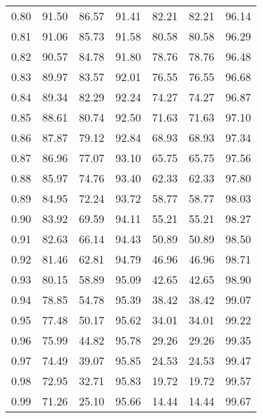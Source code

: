 \begin{tabular}{|c|c|c|c|c|c|c|}
      0.80 &     91.50 &     86.57 &      91.41 &   82.21 &      82.21 &         96.14 \\
      0.81 &     91.06 &     85.73 &      91.58 &   80.58 &      80.58 &         96.29 \\
      0.82 &     90.57 &     84.78 &      91.80 &   78.76 &      78.76 &         96.48 \\
      0.83 &     89.97 &     83.57 &      92.01 &   76.55 &      76.55 &         96.68 \\
      0.84 &     89.34 &     82.29 &      92.24 &   74.27 &      74.27 &         96.87 \\
      0.85 &     88.61 &     80.74 &      92.50 &   71.63 &      71.63 &         97.10 \\
      0.86 &     87.87 &     79.12 &      92.84 &   68.93 &      68.93 &         97.34 \\
      0.87 &     86.96 &     77.07 &      93.10 &   65.75 &      65.75 &         97.56 \\
      0.88 &     85.97 &     74.76 &      93.40 &   62.33 &      62.33 &         97.80 \\
      0.89 &     84.95 &     72.24 &      93.72 &   58.77 &      58.77 &         98.03 \\
      0.90 &     83.92 &     69.59 &      94.11 &   55.21 &      55.21 &         98.27 \\
      0.91 &     82.63 &     66.14 &      94.43 &   50.89 &      50.89 &         98.50 \\
      0.92 &     81.46 &     62.81 &      94.79 &   46.96 &      46.96 &         98.71 \\
      0.93 &     80.15 &     58.89 &      95.09 &   42.65 &      42.65 &         98.90 \\
      0.94 &     78.85 &     54.78 &      95.39 &   38.42 &      38.42 &         99.07 \\
      0.95 &     77.48 &     50.17 &      95.62 &   34.01 &      34.01 &         99.22 \\
      0.96 &     75.99 &     44.82 &      95.78 &   29.26 &      29.26 &         99.35 \\
      0.97 &     74.49 &     39.07 &      95.85 &   24.53 &      24.53 &         99.47 \\
      0.98 &     72.95 &     32.71 &      95.83 &   19.72 &      19.72 &         99.57 \\
      0.99 &     71.26 &     25.10 &      95.66 &   14.44 &      14.44 &         99.67 \\
\bottomrule
\end{tabular}
